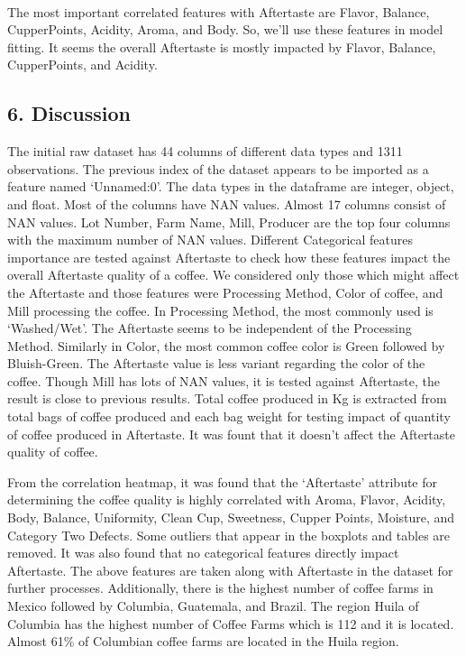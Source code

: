 \documentclass[11pt]{article}
\begin{document}
    \begin{center}
    \end{center}
    { \hspace*{\fill} \\}
    
    The most important correlated features with Aftertaste are Flavor,
Balance, CupperPoints, Acidity, Aroma, and Body. So, we'll use these
features in model fitting. It seems the overall Aftertaste is mostly
impacted by Flavor, Balance, CupperPoints, and Acidity.

    \hypertarget{discussion}{%
\subsection{6. Discussion}\label{discussion}}

    The initial raw dataset has 44 columns of different data types and 1311
observations. The previous index of the dataset appears to be imported
as a feature named `Unnamed:0'. The data types in the dataframe are
integer, object, and float. Most of the columns have NAN values. Almost
17 columns consist of NAN values. Lot Number, Farm Name, Mill, Producer
are the top four columns with the maximum number of NAN values.
Different Categorical features importance are tested against Aftertaste
to check how these features impact the overall Aftertaste quality of a
coffee. We considered only those which might affect the Aftertaste and
those features were Processing Method, Color of coffee, and Mill
processing the coffee. In Processing Method, the most commonly used is
`Washed/Wet'. The Aftertaste seems to be independent of the Processing
Method. Similarly in Color, the most common coffee color is Green
followed by Bluish-Green. The Aftertaste value is less variant regarding
the color of the coffee. Though Mill has lots of NAN values, it is
tested against Aftertaste, the result is close to previous results.
Total coffee produced in Kg is extracted from total bags of coffee
produced and each bag weight for testing impact of quantity of coffee
produced in Aftertaste. It was fount that it doesn't affect the
Aftertaste quality of coffee.

From the correlation heatmap, it was found that the `Aftertaste'
attribute for determining the coffee quality is highly correlated with
Aroma, Flavor, Acidity, Body, Balance, Uniformity, Clean Cup, Sweetness,
Cupper Points, Moisture, and Category Two Defects. Some outliers that
appear in the boxplots and tables are removed. It was also found that no
categorical features directly impact Aftertaste. The above features are
taken along with Aftertaste in the dataset for further processes.
Additionally, there is the highest number of coffee farms in Mexico
followed by Columbia, Guatemala, and Brazil. The region Huila of
Columbia has the highest number of Coffee Farms which is 112 and it is
located. Almost 61\% of Columbian coffee farms are located in the Huila
region.
\end{document}
